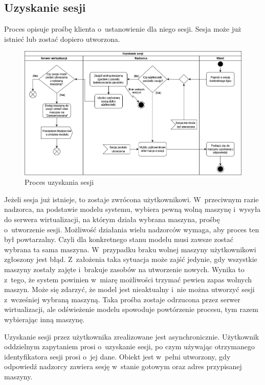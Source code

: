 \documentclass[../opis-rozwiazania.tex]{subfiles}
\begin{document}
\label{diagrams:activity_diagrams}

\subsection{Uzyskanie sesji}

Proces opisuje prośbę klienta o~ustanowienie dla niego sesji. Sesja może już istnieć lub zostać dopiero utworzona.

\begin{figure}[H]
  \centering
  \includegraphics[width=\textwidth]{../diagrams/activity_diagrams/uzyskanie_sesji_v2.png}
  \caption{Proces uzyskania sesji}
  \label{start_session}
\end{figure}

Jeżeli sesja już istnieje, to zostaje zwrócona użytkownikowi.
W~przeciwnym razie nadzorca, na podstawie modelu systemu, wybiera pewną wolną maszynę i~wysyła do serwera wirtualizacji, na którym działa wybrana maszyna, prośbę o~utworzenie sesji.
Możliwość działania wielu nadzorców wymaga, aby proces ten był powtarzalny.
Czyli dla konkretnego stanu modelu musi zawsze zostać wybrana ta sama maszyna.
W~przypadku braku wolnej maszyny użytkownikowi zgłoszony jest błąd.
Z~założenia taka sytuacja może zajść jedynie, gdy wszystkie maszyny zostały zajęte i~brakuje zasobów na utworzenie nowych. Wynika to z~tego, że system powinien w~miarę możliwości trzymać pewien zapas wolnych maszyn.
Może się zdarzyć, że model jest nieaktualny i~nie można utworzyć sesji z~wcześniej wybraną maszyną.
Taka prośba zostaje odrzucona przez serwer wirtualizacji, ale odświeżenie modelu spowoduje powtórzenie procesu, tym razem wybierając inną maszynę.

Uzyskanie sesji przez użytkownika zrealizowane jest asynchronicznie.
Użytkownik oddzielnym zapytaniem prosi o~uzyskanie sesji, po czym używając otrzymanego identyfikatora sesji prosi o~jej dane.
Obiekt jest w~pełni utworzony, gdy odpowiedź nadzorcy zawiera sesję w~stanie gotowym oraz adres przypisanej maszyny.
\end{document}
